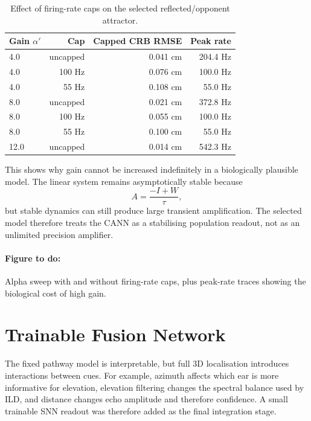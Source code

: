 \begin{table}[htbp]
    \centering
    \caption{Effect of firing-rate caps on the selected reflected/opponent attractor.}
    \label{tab:cann_rate_caps}
    \begin{tabular}{lrrr}
        \toprule
        \textbf{Gain $\alpha'$} & \textbf{Cap} & \textbf{Capped CRB RMSE} & \textbf{Peak rate} \\
        \midrule
        4.0 & uncapped & 0.041 cm & 204.4 Hz \\
        4.0 & 100 Hz & 0.076 cm & 100.0 Hz \\
        4.0 & 55 Hz & 0.108 cm & 55.0 Hz \\
        8.0 & uncapped & 0.021 cm & 372.8 Hz \\
        8.0 & 100 Hz & 0.055 cm & 100.0 Hz \\
        8.0 & 55 Hz & 0.100 cm & 55.0 Hz \\
        12.0 & uncapped & 0.014 cm & 542.3 Hz \\
        \bottomrule
    \end{tabular}
\end{table}

This shows why gain cannot be increased indefinitely in a biologically plausible model. The linear system remains asymptotically stable because
\begin{equation}
    A=\frac{-I+W}{\tau},
\end{equation}
but stable dynamics can still produce large transient amplification. The selected model therefore treats the CANN as a stabilising population readout, not as an unlimited precision amplifier.

\paragraph{Figure to do:} Alpha sweep with and without firing-rate caps, plus peak-rate traces showing the biological cost of high gain.

\section{Trainable Fusion Network}

The fixed pathway model is interpretable, but full 3D localisation introduces interactions between cues. For example, azimuth affects which ear is more informative for elevation, elevation filtering changes the spectral balance used by ILD, and distance changes echo amplitude and therefore confidence. A small trainable SNN readout was therefore added as the final integration stage.

